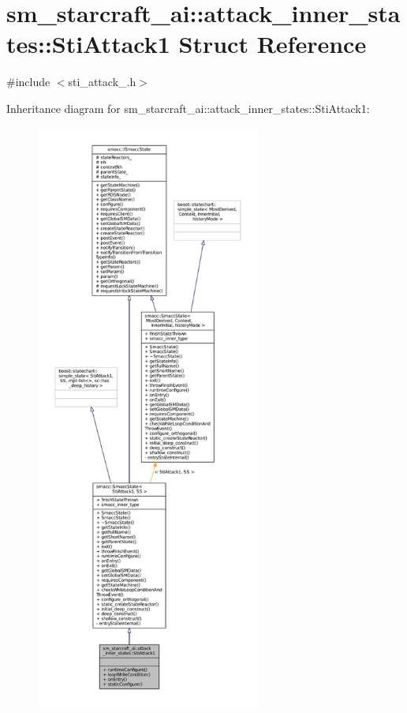 \hypertarget{structsm__starcraft__ai_1_1attack__inner__states_1_1StiAttack1}{}\section{sm\+\_\+starcraft\+\_\+ai\+:\+:attack\+\_\+inner\+\_\+states\+:\+:Sti\+Attack1 Struct Reference}
\label{structsm__starcraft__ai_1_1attack__inner__states_1_1StiAttack1}


{\ttfamily \#include $<$sti\+\_\+attack\+\_.\+h$>$}



Inheritance diagram for sm\+\_\+starcraft\+\_\+ai\+:\+:attack\+\_\+inner\+\_\+states\+:\+:Sti\+Attack1\+:
\nopagebreak
\begin{figure}[H]
\begin{center}
\leavevmode
\includegraphics[height=550pt]{structsm__starcraft__ai_1_1attack__inner__states_1_1StiAttack1__inherit__graph}
\end{center}
\end{figure}


